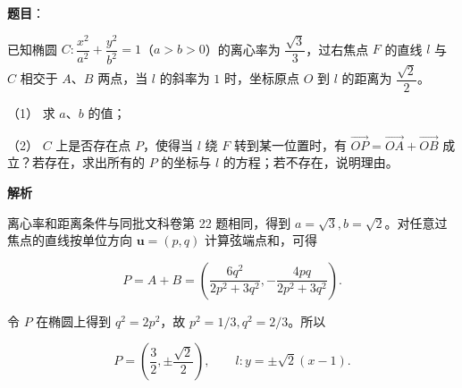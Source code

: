 \begin{answer}

\textbf{题目}：

已知椭圆 $C:\dfrac{x^2}{a^2}+\dfrac{y^2}{b^2}=1$（$a>b>0$）的离心率为 $\dfrac{\sqrt3}{3}$，过右焦点 $F$ 的直线 $l$ 与 $C$ 相交于 $A\text{、}B$ 两点，当 $l$ 的斜率为 $1$ 时，坐标原点 $O$ 到 $l$ 的距离为 $\dfrac{\sqrt2}{2}$。

（1） 求 $a\text{、}b$ 的值；

（2） $C$ 上是否存在点 $P$，使得当 $l$ 绕 $F$ 转到某一位置时，有 $\overrightarrow{OP}=\overrightarrow{OA}+\overrightarrow{OB}$ 成立？若存在，求出所有的 $P$ 的坐标与 $l$ 的方程；若不存在，说明理由。

\textbf{解析}


离心率和距离条件与同批文科卷第 22 题相同，得到
$a=\sqrt3,b=\sqrt2$。对任意过焦点的直线按单位方向
$\boldsymbol u=(p,q)$ 计算弦端点和，可得

\nopagebreak[4]
\[
P=A+B=\left(\frac{6q^2}{2p^2+3q^2},
-\frac{4pq}{2p^2+3q^2}\right).
\]


令 $P$ 在椭圆上得到 $q^2=2p^2$，故
$p^2=1/3,q^2=2/3$。所以

\nopagebreak[4]
\[
P=\left(\frac32,\pm\frac{\sqrt2}{2}\right),
\qquad
l:y=\pm\sqrt2(x-1).
\]



\end{answer}
